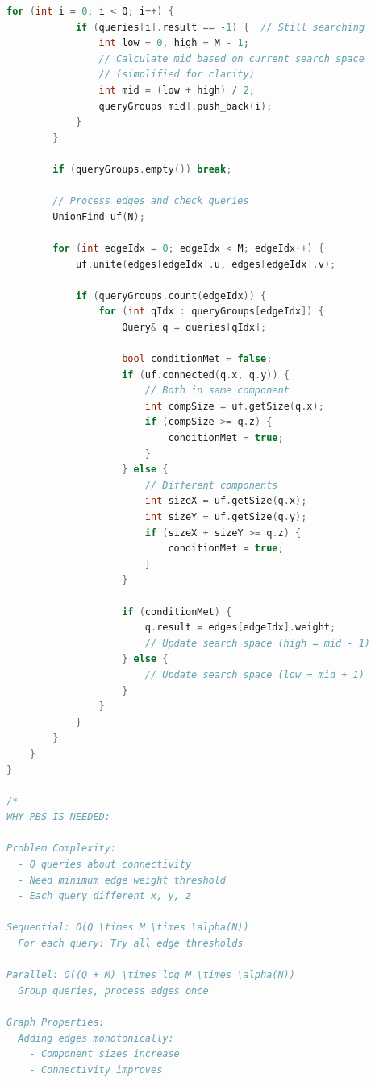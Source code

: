 \documentclass[11pt,a4paper,oneside]{book}
\begin{document}
\begin{lstlisting}[language=C++, caption=Graph Query Solutions - NEW PROBLEM]
        for (int i = 0; i < Q; i++) {
            if (queries[i].result == -1) {  // Still searching
                int low = 0, high = M - 1;
                // Calculate mid based on current search space
                // (simplified for clarity)
                int mid = (low + high) / 2;
                queryGroups[mid].push_back(i);
            }
        }
        
        if (queryGroups.empty()) break;
        
        // Process edges and check queries
        UnionFind uf(N);
        
        for (int edgeIdx = 0; edgeIdx < M; edgeIdx++) {
            uf.unite(edges[edgeIdx].u, edges[edgeIdx].v);
            
            if (queryGroups.count(edgeIdx)) {
                for (int qIdx : queryGroups[edgeIdx]) {
                    Query& q = queries[qIdx];
                    
                    bool conditionMet = false;
                    if (uf.connected(q.x, q.y)) {
                        // Both in same component
                        int compSize = uf.getSize(q.x);
                        if (compSize >= q.z) {
                            conditionMet = true;
                        }
                    } else {
                        // Different components
                        int sizeX = uf.getSize(q.x);
                        int sizeY = uf.getSize(q.y);
                        if (sizeX + sizeY >= q.z) {
                            conditionMet = true;
                        }
                    }
                    
                    if (conditionMet) {
                        q.result = edges[edgeIdx].weight;
                        // Update search space (high = mid - 1)
                    } else {
                        // Update search space (low = mid + 1)
                    }
                }
            }
        }
    }
}

/*
WHY PBS IS NEEDED:

Problem Complexity:
  - Q queries about connectivity
  - Need minimum edge weight threshold
  - Each query different x, y, z
  
Sequential: O(Q \times M \times \alpha(N))
  For each query: Try all edge thresholds

Parallel: O((Q + M) \times log M \times \alpha(N))
  Group queries, process edges once

Graph Properties:
  Adding edges monotonically:
    - Component sizes increase
    - Connectivity improves
  

\end{lstlisting}
\end{document}
